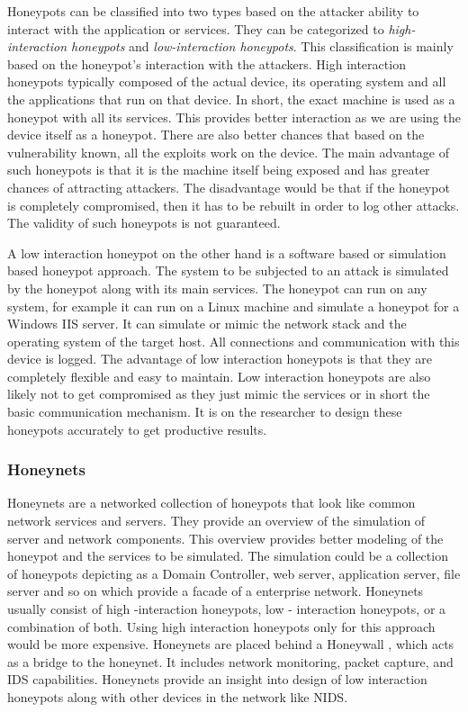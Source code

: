 \documentclass[article,msc=informatik,type=msc,colorback,accentcolor=tud9c]{tudthesis}
\begin{document}
	Honeypots can be classified into two types based on the attacker ability to interact with the application or services. They can be categorized to \textit{high-interaction honeypots} and \textit{low-interaction honeypots}. This classification is mainly based on the honeypot's interaction with the attackers. High interaction honeypots typically composed of the actual device, its operating system and all the applications that run on that device. In short, the exact machine is used as a honeypot with all its services. This provides better interaction as we are using the device itself as a honeypot. There are also better chances that based on the vulnerability known, all the exploits work on the device. The main advantage of such honeypots is that it is the machine itself being exposed and has greater chances of attracting attackers. The disadvantage would be that if the honeypot is completely compromised, then it has to be rebuilt in order to log other attacks. The validity of such honeypots is not guaranteed. 
	
	\vspace{3mm}
	A low interaction honeypot on the other hand is a software based or simulation based honeypot approach. The system to be subjected to an attack is simulated by the honeypot along with its main services. The honeypot can run on any system, for example it can run on a Linux machine and simulate a honeypot for a Windows \ac{IIS} server. It can simulate or mimic the network stack and the operating system of the target host. All connections and communication with this device is logged. The advantage of low interaction honeypots is that they are completely flexible and easy to maintain. Low interaction honeypots are also likely not to get compromised as they just mimic the services or in short the basic communication mechanism. It is on the researcher to design these honeypots accurately to get productive results.

	\vspace{5mm} 
	\subsubsection  {Honeynets} \label{Honeynets}

	Honeynets \cite{holz2008virtual} are a networked collection of honeypots that look like common network services and servers. They provide an overview of the simulation of server and network components. This overview provides better modeling of the honeypot and the services to be simulated. The simulation could be a collection of honeypots depicting as a Domain Controller, web server, application server, file server and so on which provide a facade of a enterprise network. Honeynets 	usually consist  of high -interaction honeypots, low - interaction honeypots, or a combination of both. Using high interaction honeypots only for this approach would be more expensive.
	Honeynets are placed behind a Honeywall , which acts as a bridge to the honeynet. It includes network monitoring, packet capture, and IDS capabilities. Honeynets provide an insight into design of low interaction honeypots along with other devices in the network like \ac{NIDS}.
	
\end{document}

